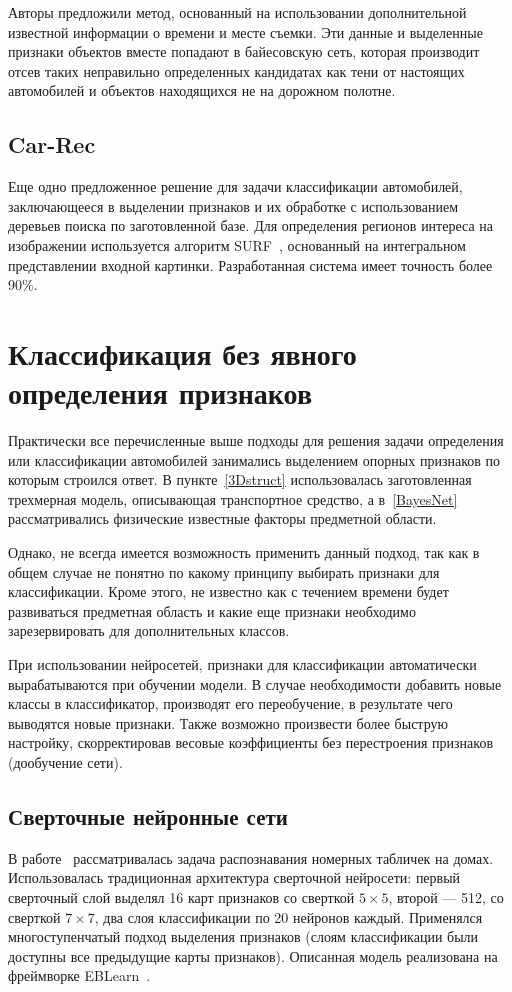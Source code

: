 \documentclass[a4paper,14pt]{extarticle} %
\begin{document}
Авторы предложили метод, основанный на использовании дополнительной известной информации о времени и месте съемки. Эти данные и выделенные признаки объектов вместе попадают в байесовскую сеть, которая производит отсев таких неправильно определенных кандидатах как тени от настоящих автомобилей и объектов находящихся не на дорожном полотне. 

\subsection[Car-Rec]{Car-Rec~\cite{jang2011car}}
\hspace{\parindent} Еще одно предложенное решение для задачи классификации автомобилей, заключающееся в выделении признаков и их обработке с использованием деревьев поиска по заготовленной базе. Для определения регионов интереса на изображении используется алгоритм SURF~\cite{bay2008speeded}, основанный на интегральном представлении входной картинки. Разработанная система имеет точность более 90\%.

\section{Классификация без явного определения признаков}
\hspace{\parindent} Практически все перечисленные выше подходы для решения задачи определения или классификации автомобилей занимались выделением опорных признаков по которым строился ответ. В пункте~\ref{3Dstruct} использовалась заготовленная трехмерная модель, описывающая транспортное средство, а в~\ref{BayesNet} рассматривались физические известные факторы предметной области.

Однако, не всегда имеется возможность применить данный подход, так как в общем случае не понятно по какому принципу выбирать признаки для классификации. Кроме этого, не известно как с течением времени будет развиваться предметная область и какие еще признаки необходимо зарезервировать для дополнительных классов. 

При использовании нейросетей, признаки для классификации автоматически вырабатываются при обучении модели. В случае необходимости добавить новые классы в классификатор, производят его переобучение, в результате чего выводятся новые признаки. Также возможно произвести более быструю настройку, скорректировав весовые коэффициенты без перестроения признаков (дообучение сети).

\subsection{Сверточные нейронные сети}
\hspace{\parindent} В работе~\cite{sermanet2012convolutional} рассматривалась задача распознавания номерных табличек на домах. Использовалась традиционная архитектура сверточной нейросети: первый сверточный слой выделял 16 карт признаков со сверткой $5 \times 5$, второй --- 512, со сверткой $7 \times 7$, два слоя классификации по 20 нейронов каждый. Применялся многоступенчатый подход выделения признаков (слоям классификации были доступны все предыдущие карты признаков). Описанная модель реализована на фреймворке EBLearn~\cite{sermanet2009eblearn}.
\end{document}

